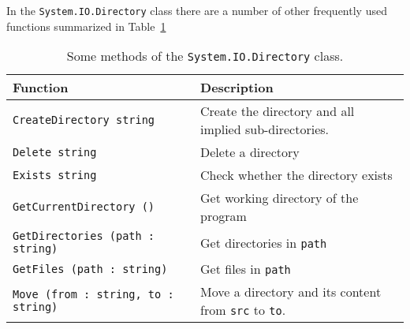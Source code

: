 In the \lstinline!System.IO.Directory! class there are a number of other frequently used functions summarized in Table~\ref{tab:directory}
\begin{table}
  \begin{center}
    \begin{tabularx}{\linewidth}{|l|X|}
      \hline
      Function & Description\\
      \hline
      \lstinline{CreateDirectory string} & Create the directory and all implied sub-directories.\\
      \hline
      \lstinline{Delete string} & Delete a directory\\
      \hline
      \lstinline{Exists string} & Check whether the directory exists\\
      \hline
      \lstinline{GetCurrentDirectory ()} & Get working directory of the program\\
      \hline
      \lstinline{GetDirectories (path : string)} & Get directories in \lstinline{path}\\
      \hline
      \lstinline{GetFiles (path : string)} & Get files in \lstinline{path}\\
      \hline
      \lstinline{Move (from : string, to : string)} & Move a directory and its content from \lstinline{src} to \lstinline{to}.\\
      \hline
    \end{tabularx}
  \end{center}
  \caption{Some methods of the \lstinline!System.IO.Directory! class.}
  \label{tab:directory}
\end{table}

